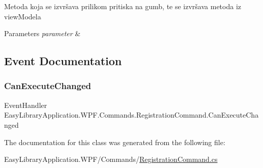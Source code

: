 Metoda koja se izvršava prilikom pritiska na gumb, te se izvršava metoda iz view\+Modela 


\begin{DoxyParams}{Parameters}
{\em parameter} & \\
\hline
\end{DoxyParams}


\subsection{Event Documentation}
\mbox{\label{class_easy_library_application_1_1_w_p_f_1_1_commands_1_1_registration_command_aa9f534c660272afc0486680f4e1abdbc}} 
\subsubsection{\texorpdfstring{Can\+Execute\+Changed}{CanExecuteChanged}}
{\footnotesize\ttfamily Event\+Handler Easy\+Library\+Application.\+W\+P\+F.\+Commands.\+Registration\+Command.\+Can\+Execute\+Changed}



The documentation for this class was generated from the following file\+:\begin{DoxyCompactItemize}
\item 
Easy\+Library\+Application.\+W\+P\+F/\+Commands/\mbox{\hyperlink{_registration_command_8cs}{Registration\+Command.\+cs}}\end{DoxyCompactItemize}
